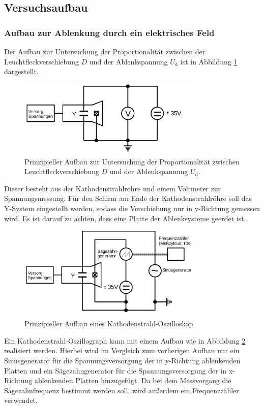\subsection{Versuchsaufbau}
\label{sec:Versuchsaufbau}
\subsubsection{Aufbau zur Ablenkung durch ein elektrisches Feld}
Der Aufbau zur Untersuchung der Proportionalität zwischen der Leuchtfleckverschiebung $D$ und
der Ablenkspannung $U_{\mathrm{d}}$ ist in Abbildung \ref{fig:verschiebungefeld} dargestellt.
\begin{figure}
  \centering
  \includegraphics[width=0.8\textwidth]{Messdaten/schaltungefeld.png}
  \caption{Prinzipieller Aufbau zur Untersuchung der Proportionalität zwischen Leuchtfleckverschiebung $D$ und der Ablenkspannung $U_\mathrm{d}$.}
  \label{fig:verschiebungefeld}
\end{figure}
Dieser besteht aus der Kathodenstrahlröhre und einem Voltmeter zur Spannungsmessung. Für den
Schirm am Ende der Kathodenstrahlröhre soll das Y-System eingestellt werden, sodass die
Verschiebung nur in y-Richtung gemessen wird. Es ist darauf zu achten, dass eine Platte
der Ablenksysteme geerdet ist.
\begin{figure}
  \centering
  \includegraphics[width=0.8\textwidth]{Messdaten/oszi.png}
  \caption{Prinzipieller Aufbau eines Kathodenstrahl-Oszilloskop.}
  \label{fig:oszillo}
\end{figure}
Ein Kathodenstrahl-Oszillograph kann mit einem Aufbau wie in Abbildung \ref{fig:oszillo}
realisiert werden. Hierbei wird im Vergleich zum vorherigen Aufbau nur ein Sinusgenerator für
die Spannungsversorgung der in y-Richtung ablenkenden Platten und ein Sägezahngenerator
für die Spannungsversorgung der in x-Richtung ablenkenden Platten hinzugefügt.
Da bei dem Messvorgang die Sägezahnfrequenz bestimmt werden soll, wird außerdem ein
Frequenzzähler verwendet.

